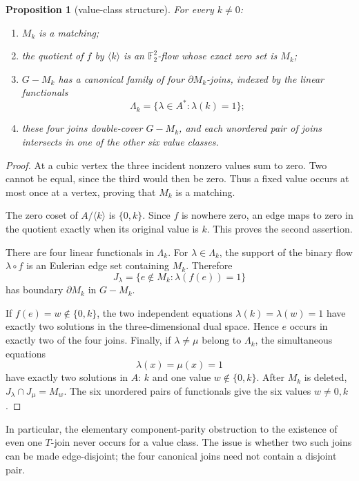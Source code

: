 \documentclass[11pt]{article}
\newtheorem{proposition}[theorem]{Proposition}
\theoremstyle{definition}
\theoremstyle{remark}
\newcommand{\F}{\mathbb F}
\newcommand{\bd}{\partial}
\begin{document}
\begin{proposition}[value-class structure]\label{prop:value}
For every \(k\ne0\):
\begin{enumerate}
  \item \(M_k\) is a matching;
  \item the quotient of \(f\) by \(\langle k\rangle\) is an
        \(\F_2^2\)-flow whose exact zero set is \(M_k\);
  \item \(G-M_k\) has a canonical family of four
        \(\bd M_k\)-joins, indexed by the linear functionals
        \[
          \Lambda_k=\{\lambda\in A^*:\lambda(k)=1\};
        \]
  \item these four joins double-cover \(G-M_k\), and each unordered pair
        of joins intersects in one of the other six value classes.
\end{enumerate}
\end{proposition}

\begin{proof}
At a cubic vertex the three incident nonzero values sum to zero.  Two
cannot be equal, since the third would then be zero.  Thus a fixed value
occurs at most once at a vertex, proving that \(M_k\) is a matching.

The zero coset of \(A/\langle k\rangle\) is \(\{0,k\}\).  Since \(f\) is
nowhere zero, an edge maps to zero in the quotient exactly when its
original value is \(k\).  This proves the second assertion.

There are four linear functionals in \(\Lambda_k\).  For
\(\lambda\in\Lambda_k\), the support of the binary flow
\(\lambda\circ f\) is an Eulerian edge set containing \(M_k\).  Therefore
\[
 J_\lambda=\{e\notin M_k:\lambda(f(e))=1\}
\]
has boundary \(\bd M_k\) in \(G-M_k\).

If \(f(e)=w\notin\{0,k\}\), the two independent equations
\(\lambda(k)=\lambda(w)=1\) have exactly two solutions in the
three-dimensional dual space.  Hence \(e\) occurs in exactly two of the
four joins.  Finally, if \(\lambda\ne\mu\) belong to \(\Lambda_k\), the
simultaneous equations
\[
 \lambda(x)=\mu(x)=1
\]
have exactly two solutions in \(A\): \(k\) and one value
\(w\notin\{0,k\}\).  After \(M_k\) is deleted,
\(J_\lambda\cap J_\mu=M_w\).  The six unordered pairs of functionals give
the six values \(w\ne0,k\).
\end{proof}

In particular, the elementary component-parity obstruction to the
existence of even one \(T\)-join never occurs for a value class.  The
issue is whether two such joins can be made edge-disjoint; the four
canonical joins need not contain a disjoint pair.
\end{document}
